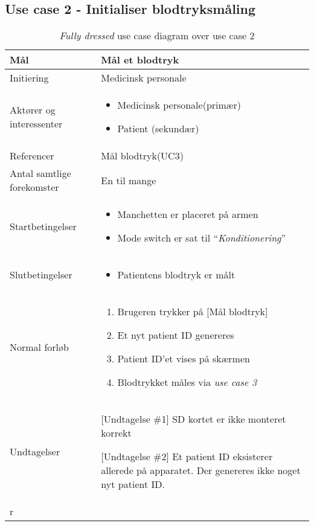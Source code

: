 	\subsection{Use case 2 - Initialiser blodtryksmåling }
	\begin{table}[H]
		\begin{center}
			\begin{tabular}{ | p{} | p{}| } 
				\hline
				Mål& Mål et blodtryk\\ 
				\hline
				Initiering &  Medicinsk personale\\
				\hline
				Aktører og interessenter & 
				\begin{itemize}
					\item Medicinsk personale(primær)
					\item Patient (sekundær)
				\end{itemize} \\ 
				\hline
				Referencer & Mål blodtryk(UC3) \\ 
				\hline
				Antal samtlige forekomster & En til mange\\ 
				\hline	
				Startbetingelser & 
				\begin{itemize}
					\item Manchetten er placeret på armen
					\item Mode switch er sat til “\textit{Konditionering}”
				\end{itemize} \\ 
				\hline
				Slutbetingelser & 
				\begin{itemize}
					\item Patientens blodtryk er målt
				\end{itemize} \\ 
				\hline
				Normal forløb & \begin{enumerate}
					\setlength\itemsep{0cm} %
					\item Brugeren trykker på [Mål blodtryk]
					\subitem [Undtagelse \#1]
					\item Et nyt patient ID genereres
					\subitem [Undtagelse \#2] 
					\item Patient ID’et vises på skærmen
					\item Blodtrykket måles via \textit{use case 3}
					
				\end{enumerate} \\ 
				\hline
				Undtagelser & [Undtagelse \#1] SD kortet er ikke monteret korrekt
				
				[Undtagelse \#2] Et patient ID eksisterer allerede på apparatet. Der genereres ikke noget nyt patient ID. \\r\\ 
				\hline
				
			\end{tabular}
		\end{center}
		\caption{\textit{Fully dressed} use case diagram over use case 2}
			\end{table}
		\newpage